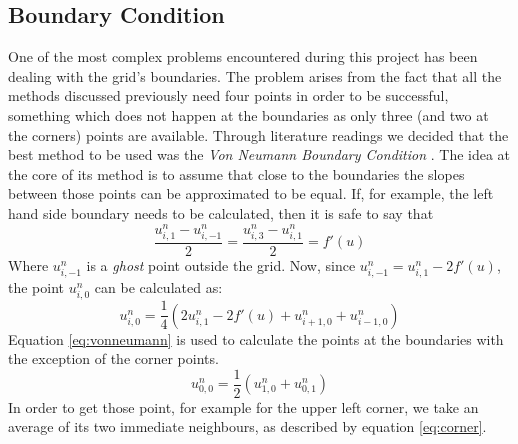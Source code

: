 \documentclass[a4paper]{article}
\begin{document}
\subsection{Boundary Condition}
One of the most complex problems encountered during this project has been 
dealing with the grid's boundaries. The problem arises from the fact that all 
the methods discussed previously need four points in order to be successful, 
something which does not happen at the boundaries as only three (and two at the 
corners) points are available. Through literature readings we decided that the 
best method to be used was the \textit{Von Neumann Boundary Condition} 
\cite{vonNeumann}. The idea at the core of its method is to assume that close
to the boundaries the slopes between those points can be approximated to be
equal. If, for example, the left hand side boundary needs to be calculated,
then it is safe to say that 
$$\frac{u^n_{i,1}-u^n_{i,-1}}{2}=\frac{u^n_{i,3}-u^n_{i,1}}{2}=f'(u)$$
Where $u^n_{i,-1}$ is a \textit{ghost} point outside the grid.  Now, since
$u^n_{i,-1}=u^n_{i,1}-2f'(u)$, the point $u^n_{i,0}$ can be 
calculated as:
\begin{equation}
u^n_{i,0}=\frac{1}{4}(2u^n_{i,1}-2f'(u)+u^n_{i+1,0}+u^n_{i-1,0})
\label{eq:vonneumann}
\end{equation}
Equation \ref{eq:vonneumann} is used to calculate the points at the boundaries 
with the exception of the corner points.
\begin{equation}
u^n_{0,0}=\frac{1}{2}(u^n_{1,0}+u^n_{0,1})
\label{eq:corner}
\end{equation}
In order to get those point, for example for the upper left corner, we take an 
average of its two immediate neighbours, as described by equation 
\ref{eq:corner}.
\end{document}

